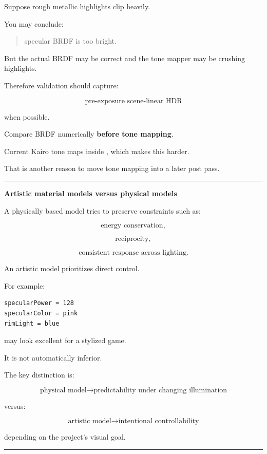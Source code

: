 Suppose rough metallic highlights clip heavily.

You may conclude:

\begin{quote}
specular BRDF is too bright.
\end{quote}

But the actual BRDF may be correct and the tone mapper may be crushing highlights.

Therefore validation should capture:

\[
\text{pre-exposure scene-linear HDR}
\]

when possible.

Compare BRDF numerically \textbf{before tone mapping}.

Current Kairo tone maps inside , which makes this harder.

That is another reason to move tone mapping into a later post pass.

\begin{center}\rule{0.5\linewidth}{0.5pt}\end{center}

\textbf{Artistic material models versus physical models}

A physically based model tries to preserve constraints such as:

\[
\text{energy conservation},
\]

\[
\text{reciprocity},
\]

\[
\text{consistent response across lighting}.
\]

An artistic model prioritizes direct control.

For example:

\begin{verbatim}
specularPower = 128
specularColor = pink
rimLight = blue
\end{verbatim}

may look excellent for a stylized game.

It is not automatically inferior.

The key distinction is:

\[
\boxed{
\text{physical model}
\rightarrow
\text{predictability under changing illumination}
}
\]

versus:

\[
\boxed{
\text{artistic model}
\rightarrow
\text{intentional controllability}
}
\]

depending on the project's visual goal.

\begin{center}\rule{0.5\linewidth}{0.5pt}\end{center}

